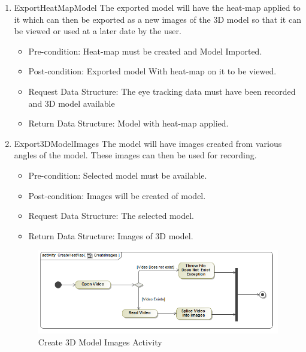 \begin{enumerate}
		\item{ExportHeatMapModel}
		The exported model will have the heat-map applied to it which can then be exported as a new images of the 3D model so that it can be viewed or used at a later date by the user. 
		\begin{itemize}
			\item Pre-condition: Heat-map must be created and Model Imported.
			\item Post-condition: Exported model With heat-map on it to be viewed.
			\item Request Data Structure: The eye tracking data must have been recorded and 3D model available
			\item Return Data Structure: Model with heat-map applied.
		\end{itemize}
		
		\item{Export3DModelImages}
		The model will have images created from various angles of the model. These images can then be used for recording.
		\begin{itemize}
			\item Pre-condition: Selected model must be available.
			\item Post-condition: Images will be created of model.
			\item Request Data Structure: The selected model.
			\item Return Data Structure: Images of 3D model.
		\end{itemize}
		
		\begin{figure}[!ht]
			\centering
			\includegraphics[scale=0.5]{Diagrams/Activity_Diagram__CreateHeatMap__CreateImages.png}
			\caption{Create 3D Model Images Activity}
		\end{figure}
	\end{enumerate}

